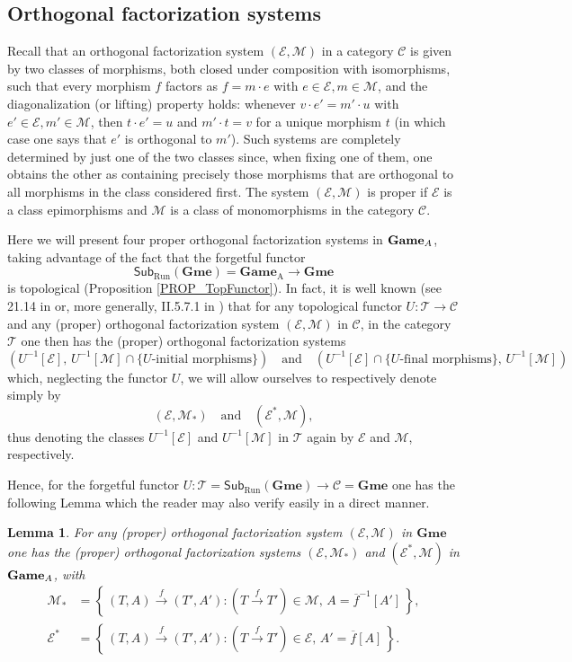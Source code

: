 \documentclass[12pt]{amsart}
\newtheorem{lemma}[thm]{Lemma}
\theoremstyle{definition}
\newcommand{\set}[1]{\left\{\, {#1} \,\right\}}
\newcommand{\A}{\textup{\textmd{\textsc{A}}}}
\newcommand{\Games}{\mathbf{Game}}
\newcommand{\Gmes}{\mathbf{Gme}}
\begin{document}
\subsection{Orthogonal factorization systems}
Recall that  an orthogonal factorization system $(\mathcal E,\mathcal M)$ in a category $\mathcal C$ is given by two classes of morphisms, both closed under composition with isomorphisms, such that every morphism $f$ factors as $f=m\cdot e$ with $e\in\mathcal E, m\in\mathcal M$, and the diagonalization (or lifting) property holds: whenever $v\cdot e'=m'\cdot u$ with $e'\in\mathcal E, m'\in\mathcal M$, then $t\cdot e'=u$ and $m'\cdot t=v$ for a unique morphism $t$ (in which case one says that $e'$ is orthogonal to $m'$). Such systems are completely determined by just one of the two classes since, when fixing one of them, one obtains the other as containing precisely those morphisms that are orthogonal to all morphisms in the class considered first. The system $(\mathcal E,\mathcal M)$ is  proper if $\mathcal E$ is a class epimorphisms and $\mathcal M$ is a class of monomorphisms in the category $\mathcal C$.

Here we will present four proper orthogonal factorization systems in $\Games_{\A}$, taking advantage of the fact that the forgetful functor $$\mathsf{Sub}_{\mathrm{Run}}(\Gmes)=\Games_{\mathrm A}\longrightarrow\Gmes$$ is topological (Proposition \ref{PROP_TopFunctor}). In fact, it is well known (see 21.14 in \cite{Adamek1990} or, more generally, II.5.7.1 in \cite{Hofmann2014}) that for any topological functor $U:\mathcal T\to \mathcal C$ and any (proper) orthogonal factorization system $(\mathcal E,\mathcal M)$ in $\mathcal C$, in the category $\mathcal T$ one then has the (proper) orthogonal factorization systems
$$(U^{-1}[\mathcal E],\,  U^{-1}[\mathcal M]\cap\{U\text{-initial morphisms}\})\quad\text{and}\quad(U^{-1}[\mathcal E]\cap\{U\text{-final morphisms}\},\, U^{-1}[\mathcal M])$$
which, neglecting the functor $U$, we will allow ourselves to respectively denote simply by
$$(\mathcal E,\mathcal M_*)\quad\text{and}\quad (\mathcal E^*,\mathcal M),$$
thus denoting the classes $U^{-1}[\mathcal E]$ and $U^{-1}[\mathcal M]$ in $\mathcal T$ again by $\mathcal E$ and $\mathcal M$, respectively.

Hence, for the forgetful functor $U:\mathcal T=\mathsf{Sub}_{\mathrm{Run}}(\Gmes)\longrightarrow\mathcal C=\Gmes$ one has the following Lemma which the reader may also verify easily in a direct manner.


\begin{lemma}\label{LEMMA_SUBOrtFactSyst}
	For any (proper) orthogonal factorization system $(\mathcal E,\mathcal M)$ in $\Gmes$ one has the (proper) orthogonal factorization systems $(\mathcal E,\mathcal M_*)$ and $(\mathcal E^*,\mathcal M)$ in $\Games_{\A}$, with
	\begin{align*}
		\mathcal M_* &= \set{(T,A)\stackrel{f}{\to}(T',A'): (T\stackrel{f}{\to}T' )	\in\mathcal M, \,A = \overline{f}^{-1}[A']},\\
		\mathcal E^* &= \set{(T,A)\stackrel{f}{\to}(T',A'): (T\stackrel{f}{\to}T' )\in\mathcal E,\, A' = \overline{f}[A]}.\\
	\end{align*}
\end{lemma}
\end{document}
